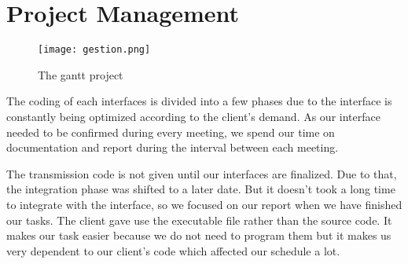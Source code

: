 \section{Project Management}

\begin{figure}[ht]
	\centering
			\texttt{[image: gestion.png]}
	\caption{The gantt project}
	\label{fig: gantt}
\end{figure}

\par \vspace{0.25cm}The coding of each interfaces is divided into a few phases due to the interface is constantly being optimized according to the client's demand. As our interface needed to be confirmed during every meeting, we spend our time on documentation and report during the interval between each meeting. 

\par \vspace{0.25cm}The transmission code is not given until our interfaces are finalized. Due to that, the integration phase was shifted to a later date. But it doesn't took a long time to integrate with the interface, so we focused on our report when we have finished our tasks. The client gave use the executable file rather than the source code. It makes our task easier because we do not need to program them but it makes us very dependent to our client's code which affected our schedule a lot. 



